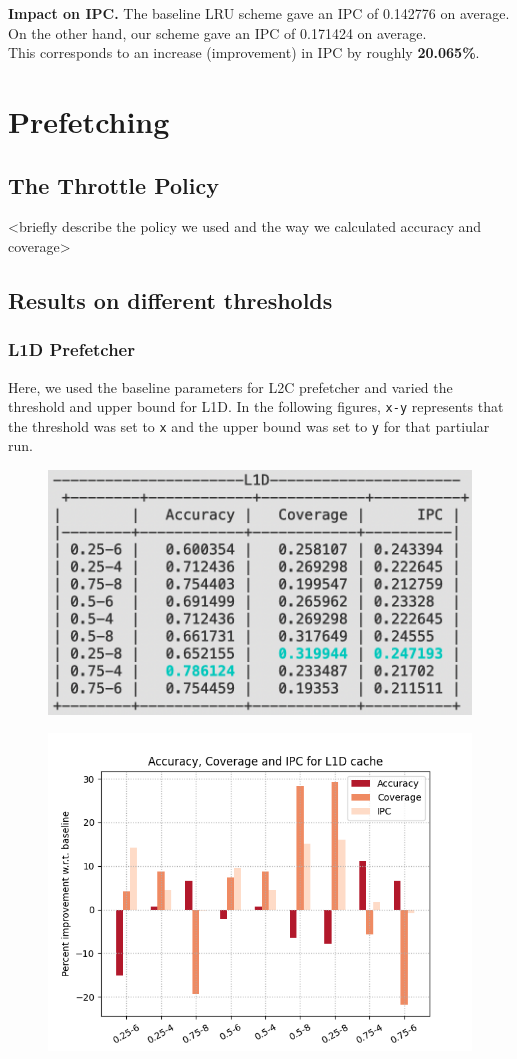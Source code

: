 \documentclass[11pt, swedish, openany]{book}
\begin{document}
\textbf{Impact on IPC.} The baseline LRU scheme gave an IPC of 0.142776 on average. On the other hand, our scheme gave an IPC of 0.171424 on average.\\
This corresponds to an increase (improvement) in IPC by roughly \textbf{20.065\%}.

\chapter{Prefetching}


\section{The Throttle Policy}
<briefly describe the policy we used and the way we calculated accuracy and coverage>

\section{Results on different thresholds}
\subsection{L1D Prefetcher}
Here, we used the baseline parameters for L2C prefetcher and varied the threshold and upper bound for L1D. In the following figures, \texttt{x-y} represents that the threshold was set to \texttt{x} and the upper bound was set to \texttt{y} for that partiular run.
\begin{figure}[H]
  \centering
  \includegraphics[width=0.8\linewidth]{images/L1D_table.png}
\end{figure}
\begin{figure}[H]
  \centering
  \includegraphics[width=0.8\linewidth]{images/L1D_plot.png}
\end{figure}
\end{document}
